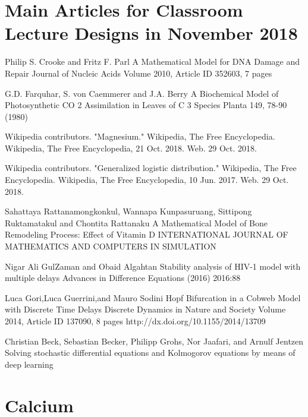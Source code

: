 

\begin{thebibliography}{00}
\small

\section{Main Articles for Classroom Lecture Designs in November 2018}
 
Philip S. Crooke and Fritz F. Parl
\newblock A Mathematical Model for DNA Damage and Repair
\newblock Journal of Nucleic Acids Volume 2010, Article ID 352603, 7 pages

 G.D. Farquhar, S. von Caemmerer and J.A. Berry  
\newblock A Biochemical Model of Photosynthetic CO 2 Assimilation in Leaves of C 3 Species 
\newblock Planta 149, 78-90 (1980) 

 Wikipedia contributors. 
\newblock "Magnesium." 
\newblock Wikipedia, The Free Encyclopedia. Wikipedia, The Free Encyclopedia, 21 Oct. 2018. Web. 29 Oct. 2018. 

Wikipedia contributors. 
\newblock "Generalized logistic distribution." 
\newblock Wikipedia, The Free Encyclopedia. Wikipedia, The Free Encyclopedia, 10 Jun. 2017. Web. 29 Oct. 2018. 

Sahattaya Rattanamongkonkul,  Wannapa Kunpasuruang, Sittipong Ruktamatakul and Chontita Rattanaku
\newblock A Mathematical Model of Bone Remodeling Process:  Effect of Vitamin D
\newblock INTERNATIONAL JOURNAL OF MATHEMATICS AND COMPUTERS IN SIMULATION

Nigar Ali GulZaman and Obaid Algahtan
\newblock Stability analysis of HIV-1 model with multiple delays
\newblock Advances in Difference Equations (2016) 2016:88 

 Luca Gori,Luca Guerrini,and Mauro Sodini
\newblock Hopf Bifurcation in a Cobweb Model with Discrete Time Delays
\newblock Discrete Dynamics in Nature and Society Volume 2014, Article ID 137090, 8 pages http://dx.doi.org/10.1155/2014/13709

 Christian Beck, Sebastian Becker, Philipp Grohs, Nor Jaafari, and Arnulf Jentzen
\newblock Solving stochastic differential equations and Kolmogorov equations by means of deep learning

\section{Calcium} 


\end{thebibliography}
